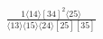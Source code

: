\documentclass[varwidth, border=5pt]{standalone}
\begin{document}
\begin{my}
$\begin{gathered}
\scriptscriptstyle\frac{1⟨14⟩[34]^2⟨25⟩}{⟨13⟩⟨15⟩⟨24⟩[25][35]}
\end{gathered}$
\end{my}
\end{document}
